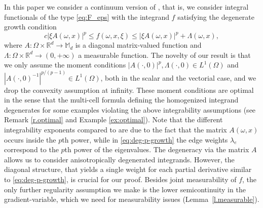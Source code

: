 \documentclass[JEP,XML,SOM,Unicode,published]{cedram}
\theoremstyle{definition}
\let\w\omega
\newcommand{\R}{\mathbb{R}}
\begin{document}
In this paper we consider a continuum version of \cite{NSS}, that is, we consider integral functionals of the type \eqref{eq:F_eps} with the integrand $f$ satisfying the degenerate growth condition\vspace*{-3pt}\enlargethispage{.5\baselineskip}%
\begin{equation}\label{eq:deg-growth}
c|\xi A(\w,x)|^p\leq f(\w,x,\xi)\leq |\xi A(\w,x)|^p+\Lambda(\w,x),
\end{equation}
where $A:\Omega\times\R^d\to \mathbb{M}_{d}$ is a diagonal matrix-valued function and $\Lambda:\Omega\times\R^d\to (0,+\infty)$ a measurable function. The novelty of our result is that we only assume the moment conditions $|A(\cdot,0)|^p,\Lambda(\cdot,0) \in L^1(\Omega)$ and $|A(\cdot,0)^{-1}|^{p/(p-1)}\in L^{1}(\Omega)$, both in the scalar and the vectorial case, and we drop the convexity assumption at infinity. These moment conditions are optimal in the sense that the multi-cell formula defining the homogenized integrand degenerates for some examples violating the above integrability assumptions (see Remark \ref{r.optimal} and Example \ref{ex:optimal}). Note that the different integrability exponents compared to \cite{NSS} are due to the fact that the matrix $A(\w,x)$ occurs inside the $p$th power, while in \eqref{eq:deg-p-growth} the edge weights $\lambda_e$ correspond to the $p$th power of the eigenvalues. The degeneracy via the matrix $A$ allows us to consider anisotropically degen\-er\-ated integrands. However, the diagonal structure, that yields a single weight for each partial derivative similar to \eqref{eq:deg-p-growth}, is crucial for our proof. Besides joint measurability of $f$, the only further regularity assumption we make is the lower semicontinuity in the gradient-variable, which we need for measurability issues (\cf Lemma~\ref{l.measurable}).
\end{document}
